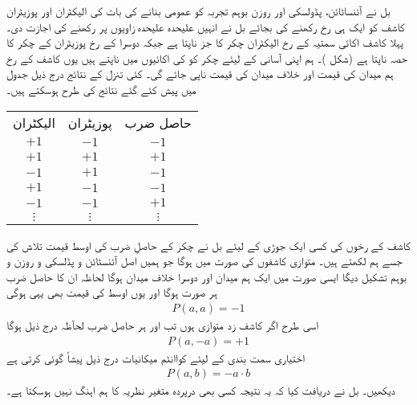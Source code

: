 بل نے آئنساٹائن، پڈولسکی اور روزن بوہم تجربہ کو عمومی بنانے کی بات کی الیکٹران اور پوزیٹران کاشف کو ایک ہی رخ رکھنے کی بجائے بل نے انہیں علیحدہ علیحدہ زاویوں پر رکھنے کی اجازت دی۔ پہلا کاشف اکائی سمتیہ   کے رخ الیکٹران چکر کا جز ناپتا ہے جبکہ دوسرا  کے رخ پوزیٹران کے چکر کا حصہ ناپتا ہے   (شکل )۔ ہم اپنی آسانی کے لیئے چکر کو  کی اکائیوں میں ناپتے ہیں یوں کاشف کے رخ ہم میدان کی قیمت  اور خلاف میدان کی قیمت  ناپی جائے گی۔ کئی  تنزل کے نتائج درج ذیل جدول میں پیش کئے گئے نتائج کی طرح ہوسکتے ہیں۔
\begin{table}[h!]
\begin{center}
\begin{tabular}{|c c c|}
\hline
الیکٹران & پوزیٹران &حاصل  ضرب \\
$+1$ & $-1$ & $-1$ \\
$+1$ & $+1$ & $+1$ \\
$-1$ & $+1$ & $-1$ \\
$+1$ & $-1$ & $-1$ \\
$-1$ & $-1$ & $+1$ \\
$\vdots$ & $\vdots$ & $\vdots$ \\
\hline
\end{tabular}
\end{center}
\end{table}
کاشف کے رخوں کی کسی ایک جوڑی کے لیئے بل نے چکر کے حاصلِ ضرب کی اوسط قیمت تلاش کی جسے ہم  لکھتے ہیں۔ متوازی کاشفوں کی صورت میں  ہوگا جو ہمیں اصل آئنسٹائن و  پڈلسکی و  روزن و  بوہم تشکیل  دیگا ایسی صورت میں ایک ہم میدان اور دوسرا خلاف میدان ہوگا لحاظہ ان کا حاصل ضرب ہر صورت  ہوگا اور یوں اوسط کی قیمت بھی یہی ہوگی
\begin{align}
	P(a, a) = -1
\end{align}
اسی طرح اگر کاشف زد متوازی ہوں تب  اور ہر حاصل ضرب  لحآظہ درج ذیل ہوگا
\begin{align}
	P(a, -a) = +1
\end{align}
اختیاری سمت بندی کے لیئے کواانٹم میکانیات درج ذیل پیشاً گوئی کرتی ہے
\begin{align}
	P(a, b) = -a\cdot b
\end{align}
 دیکھیں۔ بل نے دریافت کیا کہ یہ نتیجہ کسی بھی درپردہ متغیر نظریہ کا ہم اہنگ نہیں ہوسکتا ہے۔

